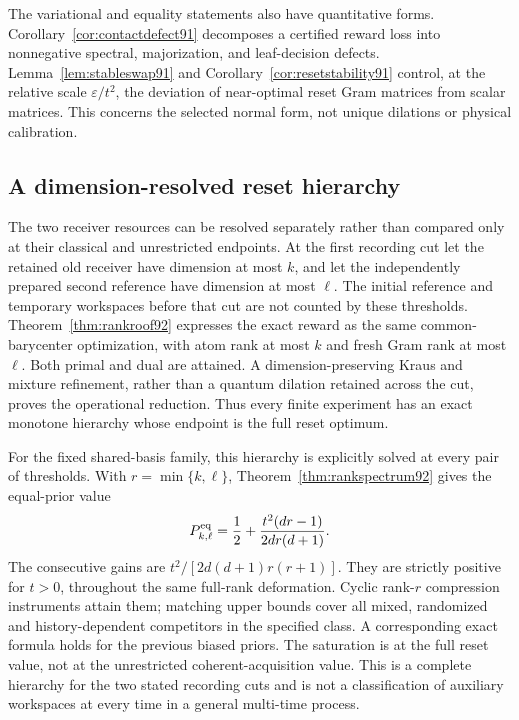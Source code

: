 The variational and equality statements also have quantitative forms.
Corollary~\ref{cor:contactdefect91} decomposes a certified reward loss
into nonnegative spectral, majorization, and leaf-decision defects.
Lemma~\ref{lem:stableswap91} and Corollary~\ref{cor:resetstability91}
control, at the relative scale $\varepsilon/t^2$, the deviation of
near-optimal reset Gram matrices from scalar matrices.  This concerns
the selected normal form, not unique dilations or physical calibration.


\subsection{A dimension-resolved reset hierarchy}
The two receiver resources can be resolved separately rather than
compared only at their classical and unrestricted endpoints.
At the first recording cut let the retained old receiver have dimension
at most $k$, and let the independently prepared second reference have
dimension at most $\ell$.  The initial reference and temporary
workspaces before that cut are not counted by these thresholds.
Theorem~\ref{thm:rankroof92} expresses the exact reward as the same
common-barycenter optimization, with atom rank at most $k$ and fresh
Gram rank at most $\ell$.  Both primal and dual are attained.
A dimension-preserving Kraus and mixture refinement, rather than a
quantum dilation retained across the cut, proves the operational
reduction.  Thus every finite experiment has an exact monotone
hierarchy whose endpoint is the full reset optimum.

For the fixed shared-basis family, this hierarchy is explicitly solved
at every pair of thresholds.  With $r=\min\{k,\ell\}$,
Theorem~\ref{thm:rankspectrum92} gives the equal-prior value
\[
 P_{k,\ell}^{\rm eq}=\frac12+\frac{t^2(dr-1)}{2dr(d+1)}.
\]
The consecutive gains are $t^2/[2d(d+1)r(r+1)]$.  They are strictly
positive for $t>0$, throughout the same full-rank deformation.
Cyclic rank-$r$ compression instruments attain them; matching upper
bounds cover all mixed, randomized and history-dependent competitors
in the specified class.  A corresponding exact formula holds for the
previous biased priors.  The saturation is at the full reset value,
not at the unrestricted coherent-acquisition value.  This is a
complete hierarchy for the two stated recording cuts and is not a
classification of auxiliary workspaces at every time in a general
multi-time process.

